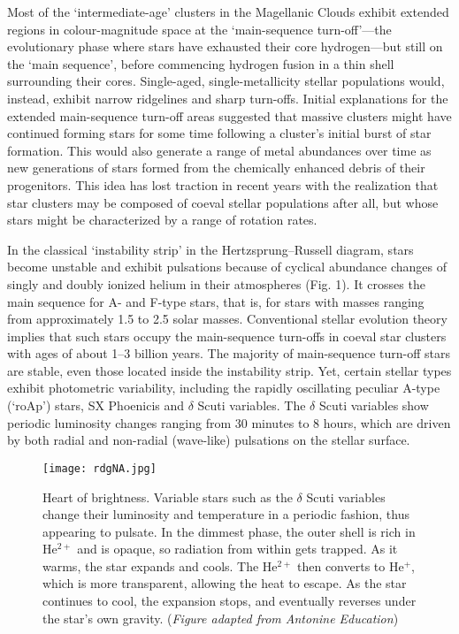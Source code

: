\documentclass{natureprintstyle2}
\begin{document}
Most of the `intermediate-age' clusters in the Magellanic Clouds
exhibit extended regions in colour-magnitude space\cite{ref3,ref4} at
the `main-sequence turn-off'---the evolutionary phase where stars have
exhausted their core hydrogen---but still on the `main sequence',
before commencing hydrogen fusion in a thin shell surrounding their
cores. Single-aged, single-metallicity stellar populations would,
instead, exhibit narrow ridgelines and sharp turn-offs. Initial
explanations for the extended main-sequence turn-off areas suggested
that massive clusters might have continued forming stars for some time
following a cluster's initial burst of star formation\cite{ref5}. This
would also generate a range of metal abundances over time as new
generations of stars formed from the chemically enhanced debris of
their progenitors. This idea has lost traction in recent years with
the realization that star clusters may be composed of coeval stellar
populations after all, but whose stars might be characterized by a
range of rotation rates\cite{ref4}.

In the classical `instability strip' in the Hertzsprung--Russell
diagram, stars become unstable and exhibit pulsations because of
cyclical abundance changes of singly and doubly ionized helium in
their atmospheres\cite{ref6} (Fig. 1). It crosses the main sequence
for A- and F-type stars, that is, for stars with masses ranging from
approximately 1.5 to 2.5 solar masses. Conventional stellar evolution
theory implies that such stars occupy the main-sequence turn-offs in
coeval star clusters with ages of about 1--3 billion years. The
majority of main-sequence turn-off stars are stable, even those
located inside the instability strip. Yet, certain stellar types
exhibit photometric variability, including the rapidly oscillating
peculiar A-type (`roAp') stars, SX Phoenicis and $\delta$ Scuti
variables. The $\delta$ Scuti variables show periodic luminosity
changes ranging from 30 minutes to 8 hours, which are driven by both
radial and non-radial (wave-like) pulsations on the stellar surface.

\begin{figure}
\texttt{[image: rdgNA.jpg]}
\begin{center}
\caption{Heart of brightness. Variable stars such as the $\delta$
  Scuti variables change their luminosity and temperature in a
  periodic fashion, thus appearing to pulsate. In the dimmest phase,
  the outer shell is rich in He$^{2+}$ and is opaque, so radiation
  from within gets trapped. As it warms, the star expands and
  cools. The He$^{2+}$ then converts to He$^+$, which is more
  transparent, allowing the heat to escape. As the star continues to
  cool, the expansion stops, and eventually reverses under the star's
  own gravity. ({\it Figure adapted from Antonine Education})}
\end{center}
\label{F1}
\end{figure}
\end{document}
